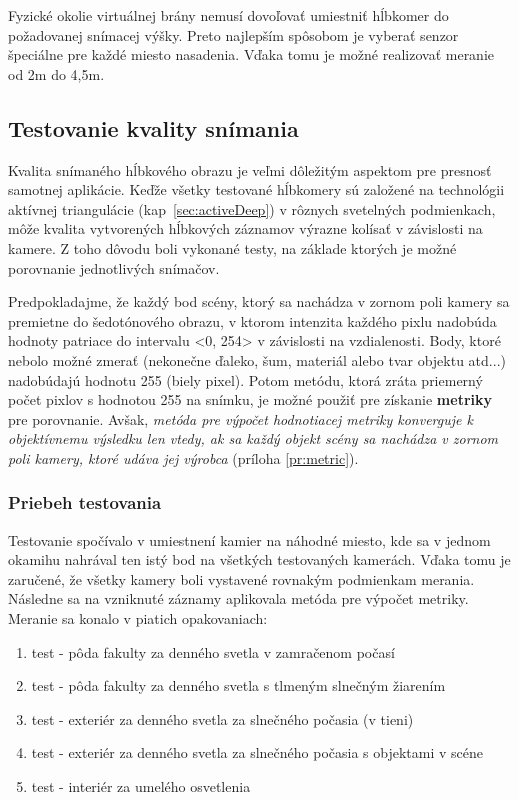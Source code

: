 Fyzické okolie virtuálnej brány nemusí dovoľovať umiestniť hĺbkomer do požadovanej snímacej výšky. Preto najlepším spôsobom je vyberať senzor špeciálne pre každé miesto nasadenia. Vďaka tomu je možné realizovať meranie od 2m do 4,5m.


\subsection{Testovanie kvality snímania}
Kvalita snímaného hĺbkového obrazu je veľmi dôležitým aspektom pre presnosť samotnej aplikácie. Keďže všetky testované hĺbkomery sú založené na technológii aktívnej triangulácie (kap~\ref{sec:activeDeep}) v rôznych svetelných podmienkach, môže kvalita vytvorených hĺbkových záznamov výrazne kolísať v závislosti na kamere. Z toho dôvodu boli vykonané testy, na základe ktorých je možné porovnanie jednotlivých snímačov. 

Predpokladajme, že každý bod scény, ktorý sa nachádza v zornom poli kamery sa premietne do šedotónového obrazu, v ktorom intenzita každého pixlu nadobúda hodnoty patriace do intervalu <0, 254> v závislosti na vzdialenosti. Body, ktoré nebolo možné zmerať (nekonečne ďaleko, šum, materiál alebo tvar objektu atd...) nadobúdajú hodnotu 255 (biely pixel). Potom metódu, ktorá zráta priemerný počet pixlov s hodnotou 255 na snímku, je možné použiť pre získanie \textbf{metriky} pre porovnanie. Avšak, \textit{metóda pre výpočet hodnotiacej metriky konverguje k objektívnemu výsledku len vtedy, ak sa každý objekt scény sa nachádza v zornom poli kamery, ktoré udáva jej výrobca} (príloha \ref{pr:metric}). 

\subsubsection{Priebeh testovania}
Testovanie spočívalo v umiestnení kamier na náhodné miesto, kde sa v jednom okamihu nahrával ten istý bod na všetkých testovaných kamerách. Vďaka tomu je zaručené, že všetky kamery boli vystavené rovnakým podmienkam merania. Následne sa na vzniknuté záznamy aplikovala metóda pre výpočet metriky. Meranie sa konalo v piatich opakovaniach: 

\begin{enumerate}
\item test - pôda fakulty za denného svetla v zamračenom počasí
\item test - pôda fakulty za denného svetla s tlmeným slnečným žiarením
\item test - exteriér za denného svetla za slnečného počasia (v tieni)
\item test - exteriér za denného svetla za slnečného počasia s objektami v scéne
\item test - interiér za umelého osvetlenia
\end{enumerate}

